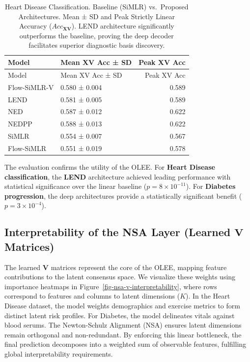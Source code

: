 \documentclass[
  letterpaper,
]{report}
\begin{document}
\begin{longtable}[]{@{}llr@{}}
\caption{Heart Disease Classification. Baseline (SiMLR) vs.~Proposed
Architectures. Mean ± SD and Peak Strictly Linear Accuracy
(\(Acc_{\mathbf{X}\mathbf{V}}\)). LEND architecture significantly
outperforms the baseline, proving the deep decoder facilitates superior
diagnostic basis discovery.}\label{tbl-heart-results}\tabularnewline
\toprule\noalign{}
Model & Mean XV Acc ± SD & Peak XV Acc \\
\midrule\noalign{}
\endfirsthead
\toprule\noalign{}
Model & Mean XV Acc ± SD & Peak XV Acc \\
\midrule\noalign{}
\endhead
\bottomrule\noalign{}
\endlastfoot
Flow-SiMLR-V & 0.580 ± 0.004 & 0.589 \\
LEND & 0.581 ± 0.005 & 0.589 \\
NED & 0.587 ± 0.012 & 0.622 \\
NEDPP & 0.588 ± 0.013 & 0.622 \\
SiMLR & 0.554 ± 0.007 & 0.567 \\
Flow-SiMLR & 0.551 ± 0.019 & 0.578 \\
\end{longtable}

The evaluation confirms the utility of the OLEE. For \textbf{Heart
Disease classification}, the \textbf{LEND} architecture achieved leading
performance with statistical significance over the linear baseline
(\(p = 8 \times 10^{-11}\)). For \textbf{Diabetes progression}, the deep
architectures provide a statistically significant benefit
(\(p = 3 \times 10^{-4}\)).

\subsection{\texorpdfstring{Interpretability of the NSA Layer (Learned
\(\mathbf{V}\)
Matrices)}{Interpretability of the NSA Layer (Learned \textbackslash mathbf\{V\} Matrices)}}\label{interpretability-of-the-nsa-layer-learned-mathbfv-matrices}

The learned \(\mathbf{V}\) matrices represent the core of the OLEE,
mapping feature contributions to the latent consensus space. We
visualize these weights using importance heatmaps in
Figure~\ref{fig-nsa-v-interpretability}, where rows correspond to
features and columns to latent dimensions (\(K\)). In the Heart Disease
dataset, the model weights demographics and exercise metrics to form
distinct latent risk profiles. For Diabetes, the model delineates vitals
against blood serums. The Newton-Schulz Alignment (NSA) ensures latent
dimensions remain orthogonal and non-redundant. By enforcing this linear
bottleneck, the final prediction decomposes into a weighted sum of
observable features, fulfilling global interpretability requirements.
\end{document}
